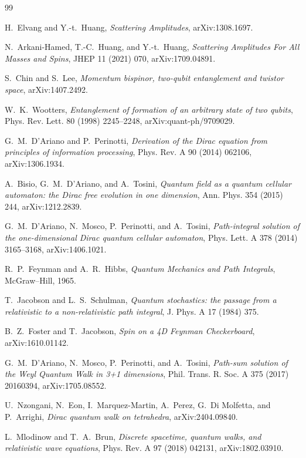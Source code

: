 \documentclass[11pt]{article}
\begin{document}
\begin{thebibliography}{99}

H.~Elvang and Y.-t.~Huang,
\emph{Scattering Amplitudes}, arXiv:1308.1697.

N.~Arkani-Hamed, T.-C.~Huang, and Y.-t.~Huang,
\emph{Scattering Amplitudes For All Masses and Spins},
JHEP 11 (2021) 070, arXiv:1709.04891.

S.~Chin and S.~Lee,
\emph{Momentum bispinor, two-qubit entanglement and twistor space},
arXiv:1407.2492.

W.~K.~Wootters,
\emph{Entanglement of formation of an arbitrary state of two qubits},
Phys. Rev. Lett. 80 (1998) 2245--2248, arXiv:quant-ph/9709029.

G.~M.~D'Ariano and P.~Perinotti,
\emph{Derivation of the Dirac equation from principles of information
processing}, Phys. Rev. A 90 (2014) 062106, arXiv:1306.1934.

A.~Bisio, G.~M.~D'Ariano, and A.~Tosini,
\emph{Quantum field as a quantum cellular automaton: the Dirac free evolution
in one dimension}, Ann. Phys. 354 (2015) 244, arXiv:1212.2839.

G.~M.~D'Ariano, N.~Mosco, P.~Perinotti, and A.~Tosini,
\emph{Path-integral solution of the one-dimensional Dirac quantum cellular
automaton}, Phys. Lett. A 378 (2014) 3165--3168, arXiv:1406.1021.

R.~P.~Feynman and A.~R.~Hibbs,
\emph{Quantum Mechanics and Path Integrals}, McGraw--Hill, 1965.

T.~Jacobson and L.~S.~Schulman,
\emph{Quantum stochastics: the passage from a relativistic to a
non-relativistic path integral}, J. Phys. A 17 (1984) 375.

B.~Z.~Foster and T.~Jacobson,
\emph{Spin on a 4D Feynman Checkerboard}, arXiv:1610.01142.

G.~M.~D'Ariano, N.~Mosco, P.~Perinotti, and A.~Tosini,
\emph{Path-sum solution of the Weyl Quantum Walk in 3+1 dimensions},
Phil. Trans. R. Soc. A 375 (2017) 20160394, arXiv:1705.08552.

U.~Nzongani, N.~Eon, I.~Marquez-Martin, A.~Perez, G.~Di Molfetta, and
P.~Arrighi,
\emph{Dirac quantum walk on tetrahedra}, arXiv:2404.09840.

L.~Mlodinow and T.~A.~Brun,
\emph{Discrete spacetime, quantum walks, and relativistic wave equations},
Phys. Rev. A 97 (2018) 042131, arXiv:1802.03910.


\end{thebibliography}
\end{document}
